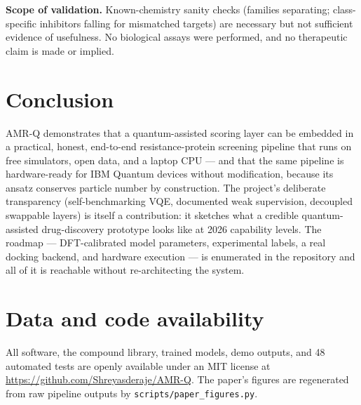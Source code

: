\documentclass[10pt,twocolumn]{article}
\begin{document}
\textbf{Scope of validation.} Known-chemistry sanity checks (families separating;
class-specific inhibitors falling for mismatched targets) are necessary but not
sufficient evidence of usefulness. No biological assays were performed, and no
therapeutic claim is made or implied.

\section{Conclusion}

AMR-Q demonstrates that a quantum-assisted scoring layer can be embedded in a
practical, honest, end-to-end resistance-protein screening pipeline that runs on free
simulators, open data, and a laptop CPU --- and that the same pipeline is
hardware-ready for IBM Quantum devices without modification, because its ansatz
conserves particle number by construction. The project's deliberate transparency
(self-benchmarking VQE, documented weak supervision, decoupled swappable layers) is
itself a contribution: it sketches what a credible quantum-assisted drug-discovery
prototype looks like at 2026 capability levels. The roadmap --- DFT-calibrated model
parameters, experimental labels, a real docking backend, and hardware execution ---
is enumerated in the repository and all of it is reachable without re-architecting the
system.

\section*{Data and code availability}
All software, the compound library, trained models, demo outputs, and 48 automated
tests are openly available under an MIT license at
\url{https://github.com/Shreyasderaje/AMR-Q}. The paper's figures are regenerated
from raw pipeline outputs by \texttt{scripts/paper\_figures.py}.
\end{document}
